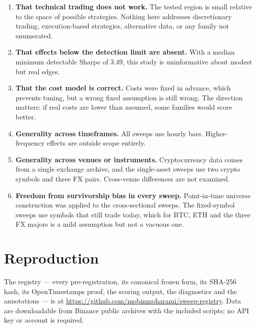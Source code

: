 \documentclass[11pt,a4paper]{article}
\begin{document}
\begin{enumerate}
\item \textbf{That technical trading does not work.} The tested region is
      small relative to the space of possible strategies. Nothing here
      addresses discretionary trading, execution-based strategies, alternative
      data, or any family not enumerated.

\item \textbf{That effects below the detection limit are absent.} With a
      median minimum detectable Sharpe of 3.49, this study is uninformative
      about modest but real edges.

\item \textbf{That the cost model is correct.} Costs were fixed in advance,
      which prevents tuning, but a wrong fixed assumption is still wrong. The
      direction matters: if real costs are lower than assumed, some families
      would score better.

\item \textbf{Generality across timeframes.} All sweeps use hourly bars.
      Higher-frequency effects are outside scope entirely.

\item \textbf{Generality across venues or instruments.} Cryptocurrency data
      comes from a single exchange archive, and the single-asset sweeps use
      two crypto symbols and three FX pairs. Cross-venue differences are not
      examined.

\item \textbf{Freedom from survivorship bias in every sweep.} Point-in-time
      universe construction was applied to the cross-sectional sweeps. The
      fixed-symbol sweeps use symbols that still trade today, which for BTC,
      ETH and the three FX majors is a mild assumption but not a vacuous one.
\end{enumerate}

\section{Reproduction}

The registry --- every pre-registration, its canonical frozen form, its
SHA-256 hash, its OpenTimestamps proof, the scoring output, the diagnostics
and the annotations --- is at
\url{https://github.com/mobinmoharami/sweep-registry}. Data are downloadable
from Binance public archives with the included scripts; no API key or account
is required.
\end{document}
